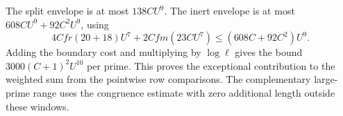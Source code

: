 The split envelope is at most \(138C U^9\).
The inert envelope is at most
\(608C U^9+92C^2U^9\), using
\[
 4Cfr(20+18)U^7+2Cfm(23C U^7)
       \le (608C+92C^2)U^9.
\]
Adding the boundary cost and multiplying by
\(\log\ell\) gives the bound
\(3000(C+1)^2 U^{10}\) per prime.
This proves the exceptional contribution to the
weighted sum from the pointwise row comparisons.
The complementary large-prime range uses the
congruence estimate with zero additional length
outside these windows.
\label{cor:prime-cost-sums-3}
